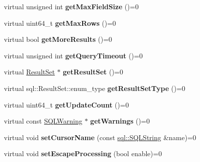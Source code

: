 \begin{DoxyCompactItemize}
virtual unsigned int {\bfseries get\+Max\+Field\+Size} ()=0
\item 
\hypertarget{classsql_1_1_statement_a2ca642c012e84b14191eecc3191466b3}{}\label{classsql_1_1_statement_a2ca642c012e84b14191eecc3191466b3} 
virtual uint64\+\_\+t {\bfseries get\+Max\+Rows} ()=0
\item 
\hypertarget{classsql_1_1_statement_a1cc03f400cb79ac740bb99f25a31d4d8}{}\label{classsql_1_1_statement_a1cc03f400cb79ac740bb99f25a31d4d8} 
virtual bool {\bfseries get\+More\+Results} ()=0
\item 
\hypertarget{classsql_1_1_statement_a4137a49581baaf8524131f686fd52f4f}{}\label{classsql_1_1_statement_a4137a49581baaf8524131f686fd52f4f} 
virtual unsigned int {\bfseries get\+Query\+Timeout} ()=0
\item 
\hypertarget{classsql_1_1_statement_ae1ea6eb2fd4de2a7716711f94aded8e0}{}\label{classsql_1_1_statement_ae1ea6eb2fd4de2a7716711f94aded8e0} 
virtual \hyperlink{classsql_1_1_result_set}{Result\+Set} $\ast$ {\bfseries get\+Result\+Set} ()=0
\item 
\hypertarget{classsql_1_1_statement_a8a00e6dc42f8c9c1171cf7f8a275b62b}{}\label{classsql_1_1_statement_a8a00e6dc42f8c9c1171cf7f8a275b62b} 
virtual sql\+::\+Result\+Set\+::enum\+\_\+type {\bfseries get\+Result\+Set\+Type} ()=0
\item 
\hypertarget{classsql_1_1_statement_a67326fb97e261aa919c73ce35fdf8784}{}\label{classsql_1_1_statement_a67326fb97e261aa919c73ce35fdf8784} 
virtual uint64\+\_\+t {\bfseries get\+Update\+Count} ()=0
\item 
\hypertarget{classsql_1_1_statement_ac05bc0fb234b66d58d9446837dd25c14}{}\label{classsql_1_1_statement_ac05bc0fb234b66d58d9446837dd25c14} 
virtual const \hyperlink{classsql_1_1_s_q_l_warning}{S\+Q\+L\+Warning} $\ast$ {\bfseries get\+Warnings} ()=0
\item 
\hypertarget{classsql_1_1_statement_a47125e21ac06a5fd48d45787dffa3459}{}\label{classsql_1_1_statement_a47125e21ac06a5fd48d45787dffa3459} 
virtual void {\bfseries set\+Cursor\+Name} (const \hyperlink{classsql_1_1_s_q_l_string}{sql\+::\+S\+Q\+L\+String} \&name)=0
\item 
\hypertarget{classsql_1_1_statement_a575bc70969296498ba409d2dcd8cc062}{}\label{classsql_1_1_statement_a575bc70969296498ba409d2dcd8cc062} 
virtual void {\bfseries set\+Escape\+Processing} (bool enable)=0
\item 
\hypertarget{classsql_1_1_statement_a8c8deb69ffd64a711d2b2b6d65747052}{}\label{classsql_1_1_statement_a8c8deb69ffd64a711d2b2b6d65747052} 

\end{DoxyCompactItemize}
